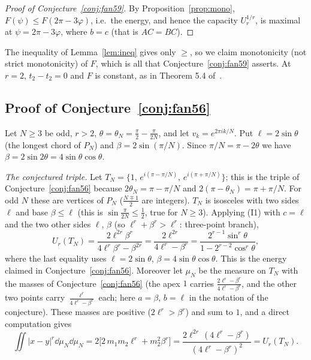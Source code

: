 \begin{proof}[Proof of Conjecture~\ref{conj:fan59}]
By Proposition~\ref{prop:mono}, $F(\psi)\le F(2\pi-3\varphi)$, i.e.\ the energy, and hence the capacity $U_r^{1/r}$, is maximal at $\psi=2\pi-3\varphi$, where $b=c$ (that is $AC=BC$).
\end{proof}

\begin{remark}
The inequality of Lemma~\ref{lem:ineq} gives only $\ge$, so we claim monotonicity (not strict monotonicity) of $F$, which is all that Conjecture~\ref{conj:fan59} asserts. At $r=2$, $t_2-t_2=0$ and $F$ is constant, as in Theorem 5.4 of~\cite{Fan}.
\end{remark}

\subsection{Proof of Conjecture~\ref{conj:fan56}}
Let $N\ge3$ be odd, $r>2$, $\theta=\theta_N=\frac\pi2-\frac\pi{2N}$, and let $v_k=e^{2\pi ik/N}$. Put $\ell=2\sin\theta$ (the longest chord of $P_N$) and $\beta=2\sin(\pi/N)$. Since $\pi/N=\pi-2\theta$ we have $\beta=2\sin2\theta=4\sin\theta\cos\theta$.

\emph{The conjectured triple.} Let $T_N=\{1,\,e^{i(\pi-\pi/N)},\,e^{i(\pi+\pi/N)}\}$; this is the triple of Conjecture~\ref{conj:fan56} because $2\theta_N=\pi-\pi/N$ and $2(\pi-\theta_N)=\pi+\pi/N$. For odd $N$ these are vertices of $P_N$ ($\frac{N\mp1}{2}$ are integers). $T_N$ is isosceles with two sides $\ell$ and base $\beta\le\ell$ (this is $\sin\frac{\pi}{2N}\le\frac12$, true for $N\ge3$). Applying (I1) with $c=\ell$ and the two other sides $\ell$, $\beta$ (so $\ell^r+\beta^r>\ell^r$: three-point branch),
\[
U_r(T_N)=\frac{2\ell^{2r}\beta^r}{4\ell^r\beta^r-\beta^{2r}}=\frac{2\ell^{2r}}{4\ell^r-\beta^r}=\frac{2^{r-1}\sin^r\theta}{1-2^{r-2}\cos^r\theta},
\]
where the last equality uses $\ell=2\sin\theta$, $\beta=4\sin\theta\cos\theta$. This is the energy claimed in Conjecture~\ref{conj:fan56}. Moreover let $\mu_N$ be the measure on $T_N$ with the masses of Conjecture~\ref{conj:fan56} (the apex $1$ carries $\frac{2\ell^r-\beta^r}{4\ell^r-\beta^r}$, and the other two points carry $\frac{\ell^r}{4\ell^r-\beta^r}$ each; here $a=\beta$, $b=\ell$ in the notation of the conjecture). These masses are positive ($2\ell^r>\beta^r$) and sum to $1$, and a direct computation gives
\[
\iint|x-y|^r\dd\mu_N\dd\mu_N=2\Big[2\,m_1m_2\ell^r+m_2^2\beta^r\Big]=\frac{2\ell^{2r}\,(4\ell^r-\beta^r)}{(4\ell^r-\beta^r)^2}=U_r(T_N).
\]

